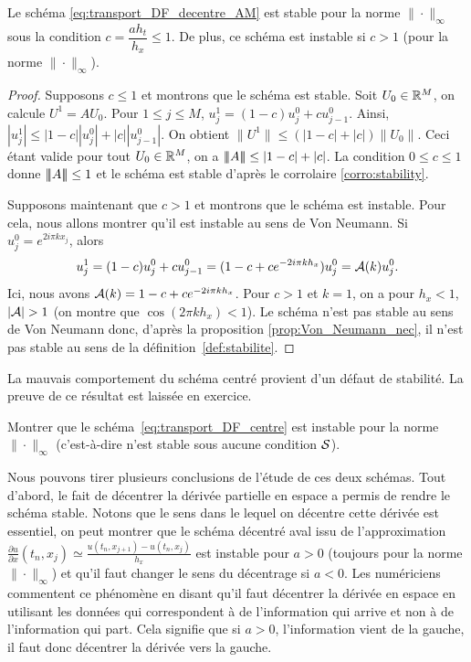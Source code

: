 \documentclass[12pt,a4paper,twoside]{article}
\begin{document}
\begin{proposition}
  \label{prop:stabilite_transport_AM}
  Le sch\'ema \eqref{eq:transport_DF_decentre_AM} est stable pour la norme $\| \cdot \|_{\infty}$
  sous la condition $c = \dfrac{a h_t}{h_x} \leq 1$.
  De plus, ce sch\'ema est instable si $c > 1$ (pour la norme $\| \cdot \|_{\infty}$).
\end{proposition}
\begin{proof}
  Supposons $c \leq 1$ et montrons que le sch\'ema est stable.
  Soit $U_0 \in \mathbb{R}^M$, on calcule $U^1 = A U_0$.
  Pour $1 \leq j \leq M$, 
  $u_j^1 = (1-c) u_j^0 + c u_{j-1}^0$.
  Ainsi, $|u_j^1| \leq |1-c| | u_j^0 | + | c | | u_{j-1}^0 |$.
  On obtient $\| U^1 \| \leq (|1-c| + |c|) \| U_0 \|$.
  Ceci \'etant valide pour tout $U_0 \in \mathbb{R}^M$, on a $|\!|\!| A |\!|\!| \leq |1-c| + |c|$.
  La condition $0 \leq c \leq 1$ donne $|\!|\!| A |\!|\!| \leq 1$ et le sch\'ema est stable 
  d'apr\`es le corrolaire \ref{corro:stability}.

  Supposons maintenant que $c > 1$ et montrons que le sch\'ema est instable.
  Pour cela, nous allons montrer qu'il est instable au sens de Von Neumann.
  Si $u_j^0 = e^{2i\pi k x_j}$, alors
  \[
    u_j^{1} = (1-c) u_j^0 + c u_{j-1}^0 = (1 - c + c e^{-2i\pi k h_x}) u_j^0 
    = \mathcal{A}(k) u_j^0.
  \]
  Ici, nous avons $\mathcal{A}(k) = 1 - c + c e^{-2i\pi k h_x}$.
  Pour $c > 1$ et $k=1$, on a pour $h_x<1$,
  $| \mathcal{A} | > 1$ (on montre que $\cos(2\pi k h_x) < 1$). 
  Le sch\'ema n'est pas stable au sens 
  de Von Neumann donc, d'apr\`es la proposition \ref{prop:Von_Neumann_nec},
  il n'est pas stable au sens de la d\'efinition~\ref{def:stabilite}.
\end{proof}

La mauvais comportement du sch\'ema centr\'e provient d'un d\'efaut
de stabilit\'e. La preuve de ce r\'esultat est laiss\'ee en exercice.
\begin{exercise}
  Montrer que le sch\'ema~\eqref{eq:transport_DF_centre} est instable
  pour la norme $\| \cdot \|_{\infty}$
  (c'est-\`a-dire n'est stable sous aucune condition $\mathcal{S}$).
\end{exercise}



Nous pouvons tirer plusieurs conclusions de l'\'etude de ces deux sch\'emas.
Tout d'abord, le fait de d\'ecentrer la d\'eriv\'ee partielle en espace
a permis de rendre le sch\'ema stable.
Notons que le sens dans le lequel on d\'ecentre cette d\'eriv\'ee est essentiel,
on peut montrer que le sch\'ema d\'ecentr\'e aval 
issu de l'approximation 
$\frac{\partial u}{\partial x} (t_n , x_j) \simeq \frac{u(t_n,x_{j+1}) - u(t_n,x_{j})}{h_x}$ 
est instable pour 
$a>0$ (toujours pour la norme $\| \cdot \|_{\infty}$) et qu'il faut changer le sens du d\'ecentrage si $a<0$.
Les num\'ericiens commentent ce ph\'enom\`ene en disant
qu'il faut d\'ecentrer la d\'eriv\'ee en espace en utilisant les donn\'ees qui correspondent
\`a de l'information qui arrive et non \`a de l'information qui part.
Cela signifie que si $a>0$, l'information vient de la gauche, il faut donc d\'ecentrer la d\'eriv\'ee vers la gauche.
\end{document}
